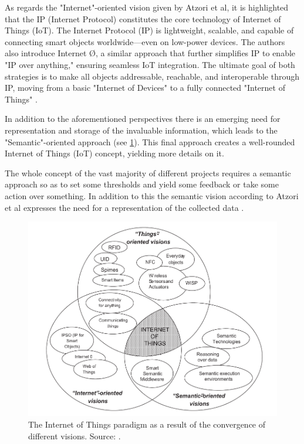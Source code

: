 {As regards the "Internet"-oriented vision given by Atzori et al, it is highlighted that the IP (Internet Protocol) constitutes the core technology of Internet of Things (IoT). The Internet Protocol (IP) is lightweight, scalable, and capable of connecting smart objects worldwide—even on low-power devices. The authors also introduce Internet Ø, a similar approach that further simplifies IP to enable "IP over anything," ensuring seamless IoT integration. The ultimate goal of both strategies is to make all objects addressable, reachable, and interoperable through IP, moving from a basic "Internet of Devices" to a fully connected "Internet of Things" \cite{Atzori2010}. 

In addition to the aforementioned perspectives there is an emerging need for representation and storage of the invaluable information, which leads to the "Semantic"-oriented approach (see \ref{fig:IoT}). This final approach creates a well-rounded Internet of Things (IoT) concept, yielding more details on it. 

The whole concept of the vast majority of different projects requires a semantic approach so as to set some thresholds and yield some feedback or take some action over something. In addition to this the semantic vision according to Atzori et al expresses the need for a representation of the collected data \cite{Atzori2010}.

\begin{figure}[h]
    \centering
    \includegraphics[width=\linewidth]{figures/IoT.png}
    \caption{The Internet of Things paradigm as a result of the convergence of different visions. Source: \cite{Atzori2010}.}
    \label{fig:IoT}
\end{figure}

}
